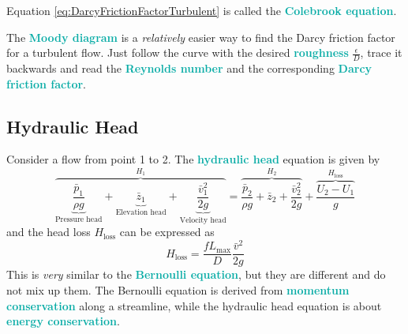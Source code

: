 \documentclass[twoside]{article}
\newcommand{\highlightbluetext}[1]{\textcolor[HTML]{09ACA6}{\textbf{#1}}}
\numberwithin{equation}{section}
\begin{document}
	Equation \ref{eq:DarcyFrictionFactorTurbulent} is called the \highlightbluetext{Colebrook equation}.
	
	The \highlightbluetext{Moody diagram} is a \emph{relatively} easier way to find the Darcy friction factor for a turbulent flow. Just follow the curve with the desired \highlightbluetext{roughness} $\frac{\epsilon}{D}$, trace it backwards and read the \highlightbluetext{Reynolds number} and the corresponding \highlightbluetext{Darcy friction factor}.
	
	\subsection{Hydraulic Head}
	\label{subsec:HydraulicHead}
	
	Consider a flow from point 1 to 2. The \highlightbluetext{hydraulic head} equation is given by
	\begin{equation}
		\overbrace{\underbrace{\frac{\bar{p}_1}{\rho g}}_{\text{Pressure head}}+\underbrace{\bar{z}_1}_{\text{Elevation head}}+\underbrace{\frac{\bar{v}_1^2}{2g}}_{\text{Velocity head}}}^{H_1} = \overbrace{\frac{\bar{p}_2}{\rho g}+\bar{z}_2+\frac{\bar{v}_2^2}{2g}}^{H_2}+\overbrace{\frac{U_2-U_1}{g}}^{H_{\text{loss}}}
		\label{eq:HydraulicHead}
	\end{equation}
	and the head loss $H_{\text{loss}}$ can be expressed as
	\begin{equation}
		H_{\text{loss}} = \frac{fL_{\text{max}}}{D} \frac{\bar{v}^2}{2g}
	\end{equation}
	This is \emph{very} similar to the \highlightbluetext{Bernoulli equation}, but they are different and do not mix up them. The Bernoulli equation is derived from \highlightbluetext{momentum conservation} along a streamline, while the hydraulic head equation is about \highlightbluetext{energy conservation}.
	
\end{document}

